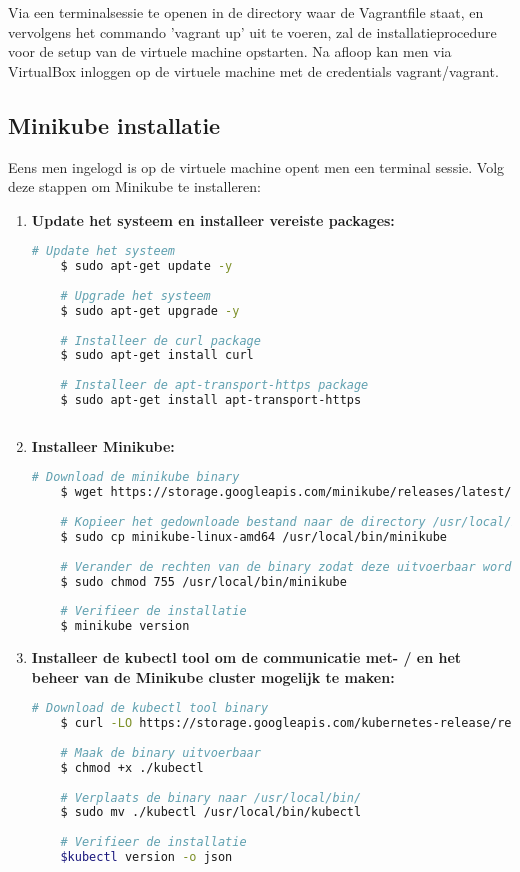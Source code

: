 Via een terminalsessie te openen in de directory waar de Vagrantfile staat, en vervolgens het commando 'vagrant up' uit te voeren, zal de installatieprocedure voor de setup van de virtuele machine opstarten. Na afloop kan men via VirtualBox inloggen op de virtuele machine met de credentials vagrant/vagrant. 


\subsection{Minikube installatie}

Eens men ingelogd is op de virtuele machine opent men een terminal sessie. 
Volg deze stappen om Minikube te installeren: \autocite{Simic2020}
\begin{enumerate}
    \item {\bf Update het systeem en installeer vereiste packages:}
    \begin{lstlisting}[language=bash]
    # Update het systeem
    $ sudo apt-get update -y
    
    # Upgrade het systeem
    $ sudo apt-get upgrade -y
    
    # Installeer de curl package
    $ sudo apt-get install curl
    
    # Installeer de apt-transport-https package
    $ sudo apt-get install apt-transport-https
    
    \end{lstlisting}

    \item {\bf Installeer Minikube:}
    \begin{lstlisting}[language=bash]
    # Download de minikube binary
    $ wget https://storage.googleapis.com/minikube/releases/latest/minikube-linux-amd64
    
    # Kopieer het gedownloade bestand naar de directory /usr/local/bin/minikube
    $ sudo cp minikube-linux-amd64 /usr/local/bin/minikube
    
    # Verander de rechten van de binary zodat deze uitvoerbaar wordt
    $ sudo chmod 755 /usr/local/bin/minikube
    
    # Verifieer de installatie
    $ minikube version
    \end{lstlisting}

    \item {\bf Installeer de kubectl tool om de communicatie met- / en het beheer van de Minikube cluster mogelijk te maken:}
    \begin{lstlisting}[language=bash]
    # Download de kubectl tool binary
    $ curl -LO https://storage.googleapis.com/kubernetes-release/release/`curl -s https://storage.googleapis.com/kubernetes-release/release/stable.txt`/bin/linux/amd64/kubectl
    
    # Maak de binary uitvoerbaar
    $ chmod +x ./kubectl
    
    # Verplaats de binary naar /usr/local/bin/
    $ sudo mv ./kubectl /usr/local/bin/kubectl
    
    # Verifieer de installatie
    $kubectl version -o json
    \end{lstlisting}
    
\end{enumerate} 

